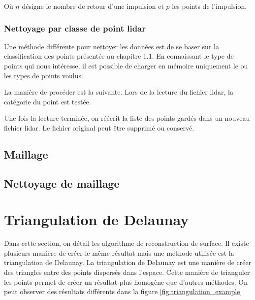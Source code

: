 Où $n$ désigne le nombre de retour d'une impulsion et $p$ les points de l'impulsion.

\subsubsection{Nettoyage par classe de point lidar}

Une méthode différente pour nettoyer les données est de se baser sur la 
classification des points présentée au chapitre 1.1.
En connaissant le type de points qui nous intéresse, il est possible de charger
en mémoire uniquement le ou les types de points voulus. 

La manière de procéder est la suivante.
Lors de la lecture du fichier lidar, la catégorie du point est testée.

Une fois la lecture terminée, on réécrit la liste des points gardés dans un nouveau fichier \gls{lidar}.
Le fichier original peut être supprimé ou conservé.


\subsection{Maillage}

\subsection{Nettoyage de maillage}



\section{Triangulation de Delaunay}
Dans cette section, on détail les algorithme de reconstruction de surface.
Il existe plusieurs manière de créer le même résultat mais une méthode utilisée est la triangulation de Delaunay.
La triangulation de Delaunay est une manière de créer des triangles entre des points dispersés dans l’espace.
Cette manière de trianguler les points permet de créer un résultat plus homogène que d’autres méthodes.
On peut observer des résultats différents dans la figure
\ref{fig:triangulation_example}

